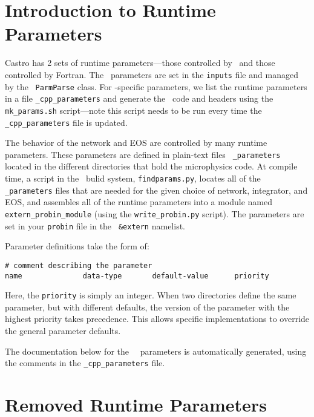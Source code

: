 \label{chapter:parameters}

\section{Introduction to Runtime Parameters}

Castro has 2 sets of runtime parameters---those controlled by
\cpp\ and those controlled by Fortran.  The \cpp\ parameters are set
in the {\tt inputs} file and managed by the \boxlib\ {\tt ParmParse}
class.  For \castro-specific parameters, we list the runtime
parameters in a file {\tt \_cpp\_parameters} and generate the
\cpp\ code and headers using the {\tt mk\_params.sh} script---note
this script needs to be run every time the {\tt \_cpp\_parameters}
file is updated.

The behavior of the network and EOS are controlled by many runtime
parameters.  These parameters are defined in plain-text files {\tt
  \_parameters} located in the different directories that hold the
microphysics code.  At compile time, a script in the \boxlib\ bulid
system, {\tt findparams.py}, locates all of the {\tt \_parameters}
files that are needed for the given choice of network, integrator, and
EOS, and assembles all of the runtime parameters into a module named
{\tt extern\_probin\_module} (using the {\tt write\_probin.py}
script).  The parameters are set in your {\tt probin} file in the {\tt
  \&extern} namelist.

Parameter definitions take the form of:
\begin{verbatim}
# comment describing the parameter
name              data-type       default-value      priority
\end{verbatim}
Here, the {\tt priority} is simply an integer.  When two directories
define the same parameter, but with different defaults, the version of
the parameter with the highest priority takes precedence.  This allows
specific implementations to override the general parameter defaults.

The documentation below for the \castro\ \cpp\ parameters is
automatically generated, using the comments in the {\tt \_cpp\_parameters}
file.



\section{Removed Runtime Parameters}

